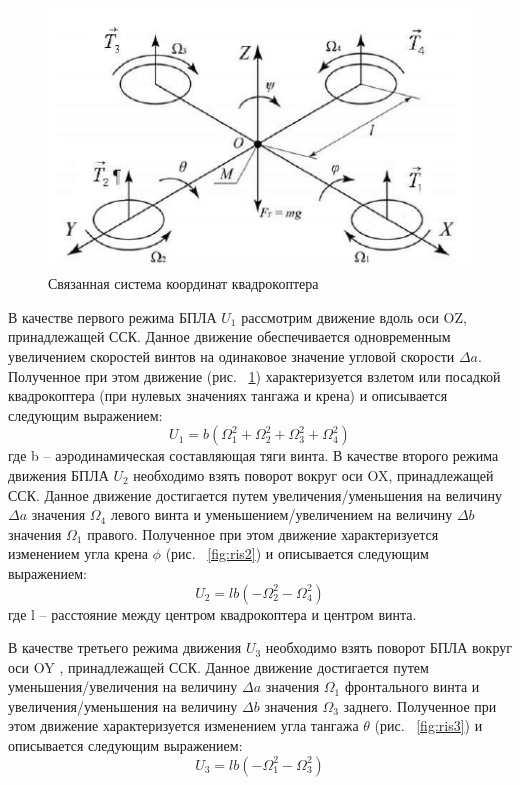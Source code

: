 \begin{figure}[H]
	\centering
	\includegraphics[width=0.5\linewidth]{pics/ris1}
	\caption{Связанная система координат квадрокоптера
	}
	\label{fig:ris1} %
\end{figure}
В качестве первого режима БПЛА \(U_{1}\) рассмотрим движение вдоль оси OZ, принадлежащей ССК. Данное движение обеспечивается одновременным увеличением скоростей винтов на одинаковое значение угловой скорости \(\Delta a\). Полученное при этом движение (рис. ~\ref{fig:ris1}) характеризуется взлетом или посадкой квадрокоптера (при нулевых значениях тангажа и крена) и описывается следующим выражением:
\begin{equation}
U_{1}=b(\Omega_{1}^2+\Omega_{2}^2+\Omega_{3}^2+\Omega_{4}^2)
\end{equation}
где b – аэродинамическая составляющая тяги винта.
В качестве второго режима движения БПЛА \(U_{2}\) необходимо взять поворот вокруг оси OX, принадлежащей ССК. Данное движение достигается путем увеличения/уменьшения на величину \(\Delta a\) значения \(\Omega_{4}\) левого винта и уменьшением/увеличением на величину \(\Delta b\) значения \(\Omega_{1}\)
правого. Полученное при этом движение характеризуется изменением угла крена \(\phi\) (рис. ~\ref{fig:ris2}) и описывается следующим выражением:
\begin{equation}
U_{2}=lb(-\Omega_{2}^2-\Omega_{4}^2)
\end{equation}
где l – расстояние между центром квадрокоптера и центром винта.

В качестве третьего режима движения \(U_{3}\) необходимо взять поворот БПЛА вокруг оси OY , принадлежащей ССК. Данное движение достигается путем уменьшения/увеличения на величину \(\Delta a\) значения \(\Omega_{1}\) фронтального винта и увеличения/уменьшения на величину \(\Delta b\) значения \(\Omega_{3}\) заднего. Полученное при этом движение характеризуется изменением угла тангажа \(\theta\) (рис. ~\ref{fig:ris3}) и описывается следующим выражением:
\begin{equation}
U_{3}=lb(-\Omega_{1}^2-\Omega_{3}^2)
\end{equation}


